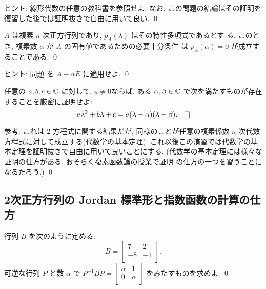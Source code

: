 \documentclass[12pt,twoside]{jarticle}
\begin{document}
\noindent 
ヒント: 線形代数の任意の教科書を参照せよ. なお, 
この問題の結論はその証明を復習した後では証明抜きで自由に用いて良い.
\qed


\begin{question}[5点]
  $A$ は複素 $n$ 次正方行列であり, $p_A(\lambda)$ はその特性多項式であるとす
  る.  このとき, 複素数 $\alpha$ が $A$ の固有値であるための必要十分条件
  は $p_A(\alpha)=0$ が成立することである. 
  \qed
\end{question}

\noindent 
ヒント: 問題  を $A - \alpha E$ に適用せよ.
\qed


\begin{question}[5点]
  任意の $a,b,c\in{\mathbb C}$ に対して, $a\ne0$ならば, 
  ある $\alpha,\beta\in{\mathbb C}$ で次を満たすものが存在することを厳密に証明せよ:
  \begin{equation*}
    a \lambda^2 + b \lambda + c 
    = a(\lambda - \alpha)(\lambda - \beta).
    \qed
  \end{equation*}
\end{question}

\noindent 
参考: これは $2$ 方程式に関する結果だが, 
同様のことが任意の複素係数 $n$ 次代数方程式に対して成立する(代数学の基本定理). 
これ以後この演習では代数学の基本定理を証明抜きで自由に用いて良いことにする. 
(代数学の基本定理には様々な証明の仕方がある. おそらく複素函数論の授業で証明
の仕方の一つを習うことになるだろう.)
\qed


\subsection{2次正方行列の Jordan 標準形と指数函数の計算の仕方}
\label{sec:2x2-Jordan}


\begin{question}[簡単だが一度はやるべき問題なので10点]
  行列 $B$ を次のように定める:
  \begin{equation*}
    B = 
    \begin{bmatrix}
        7 &  2 \\
       -8 & -1 \\
     \end{bmatrix}.
   \end{equation*}
   可逆な行列 $P$ と数 $\alpha$ で %
   $P^{-1}BP = 
   \begin{bmatrix}
     \alpha & 1 \\
     0 & \alpha \\
   \end{bmatrix}$ をみたすものを求めよ. 
   \qed
\end{question}
\end{document}
